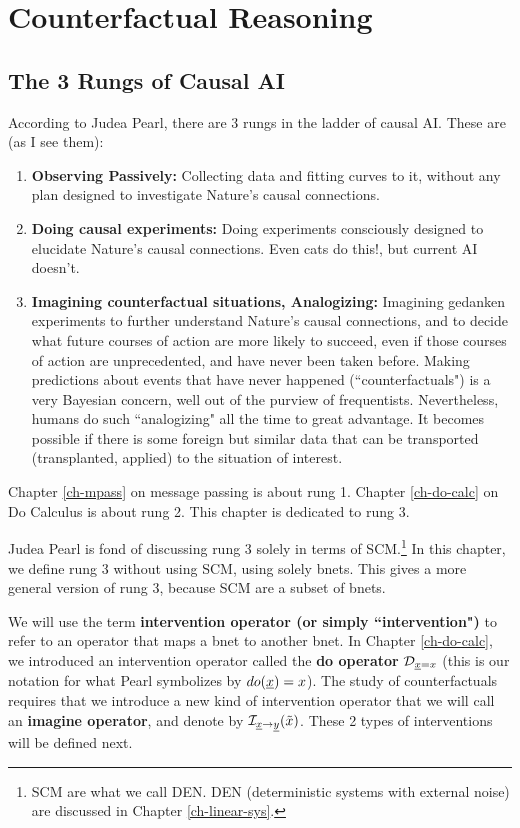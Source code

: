 \chapter{Counterfactual Reasoning}
\label{ch-counterf}


\section{The 3 Rungs of Causal AI}
According to 
Judea Pearl,
there are 3 rungs in the
ladder of causal AI.
These are (as I see them):
\begin{enumerate}
\item
{\bf Observing Passively:} Collecting 
data
and fitting curves to it,
without any plan 
designed to
investigate Nature's 
causal connections.
\item {\bf Doing causal
experiments:} 
Doing experiments 
consciously designed to
elucidate
Nature's causal connections.
Even cats do this!, but current AI doesn't.
\item {\bf Imagining
 counterfactual situations, Analogizing:}
Imagining gedanken experiments
to further understand
Nature's causal connections,
and to decide what future
courses of action are
more likely to succeed,
even if
those courses of action
are unprecedented, and have never been taken before.
Making
predictions about
 events that have never happened (``counterfactuals")
is a very Bayesian
concern, well out of the purview of 
frequentists. Nevertheless,
humans do such
``analogizing" 
all the time to great advantage.
It becomes
possible if there
is some foreign but similar
data that can be transported
(transplanted, applied)
to the situation of
interest.
\end{enumerate}
Chapter \ref{ch-mpass}
on message passing
is about rung 1.
Chapter \ref{ch-do-calc}
on Do Calculus is about rung 2.
This chapter is dedicated to rung 3.

Judea Pearl 
is fond of discussing rung 3 solely
in terms of SCM.\footnote{SCM are 
what we call DEN. DEN (deterministic systems
with external noise) are discussed in
Chapter \ref{ch-linear-sys}. }
In this chapter,
we define rung 3
without using SCM, using solely
bnets.
This gives a more general
version of rung 3,
because SCM are a subset of bnets.



We will use the
term {\bf intervention operator (or simply ``intervention")} 
to refer to an operator
that maps a bnet to another bnet.
In Chapter \ref{ch-do-calc},
we introduced an intervention operator
 called the {\bf do operator}
${\cal D}_{{\underline{x}}=x}$ (this is our notation for what Pearl 
symbolizes by $do({\underline{x}})=x$).
The study of counterfactuals 
requires that we
introduce a new
kind of intervention 
operator that we will
call an {\bf imagine operator},
and denote by ${\cal I}_{{\underline{x}}\rightarrow{\underline{y}}}(\tilde{x})$.
These 2 types of interventions 
will be defined 
next.

